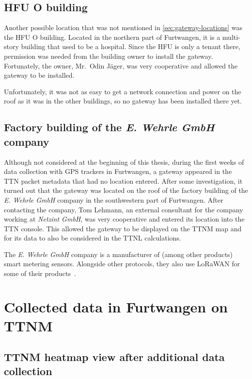 \subsection{\acl{HFU} O building}\label{subsec:conclusion-hfu-o-building}

Another possible location that was not mentioned in \cref{sec:gateway-locations} was the \ac{HFU} O building.
Located in the northern part of Furtwangen, it is a multi-story building that used to be a hospital.
Since the \ac{HFU} is only a tenant there, permission was needed from the building owner to install the gateway.
Fortunately, the owner, Mr.\ Odin Jäger, was very cooperative and allowed the gateway to be installed.

Unfortunately, it was not as easy to get a network connection and power on the roof as it was in the other buildings, so no gateway has been installed there yet.

\subsection{Factory building of the \emph{E. Wehrle GmbH} company}\label{subsec:factory-building-of-the-e-wehrle-company}

Although not considered at the beginning of this thesis, during the first weeks of data collection with \ac{GPS} trackers in Furtwangen, a gateway appeared in the \ac{TTN} packet metadata that had no location entered.
After some investigation, it turned out that the gateway was located on the roof of the factory building of the \emph{E. Wehrle GmbH} company in the southwestern part of Furtwangen.
After contacting the company, Tom Lehmann, an external consultant for the company working at \emph{Netzint GmbH}, was very cooperative and entered its location into the \ac{TTN} console.
This allowed the gateway to be displayed on the \ac{TTNM} map and for its data to also be considered in the \ac{TTNL} calculations.

The \emph{E. Wehrle GmbH} company is a manufacturer of (among other products) smart metering sensors.
Alongside other protocols, they also use \ac{LoRaWAN} for some of their products~\cite{e_wehrle_gmbh_wecount-s_nodate}.

\section{Collected data in Furtwangen on \acl{TTNM}}\label{sec:collected-data-in-furtwangen-on-ttnm}

\subsection{\acl{TTNM} heatmap view after additional data collection}\label{sec:ttm_heatmap_after}

